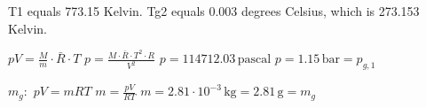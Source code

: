 T1 equals 773.15 Kelvin.  
Tg2 equals 0.003 degrees Celsius, which is 273.153 Kelvin.

\( pV = \frac{M}{m} \cdot \bar{R} \cdot T \)  
\( p = \frac{M \cdot \bar{R} \cdot T^2 \cdot R}{V^2} \)  
\( p = 114712.03 \, \text{pascal} \)  
\( p = 1.15 \, \text{bar} = p_{g,1} \)  

\( m_g: \)  
\( pV = mRT \)  
\( m = \frac{pV}{RT} \)  
\( m = 2.81 \cdot 10^{-3} \, \text{kg} = 2.81 \, \text{g} = m_g \)